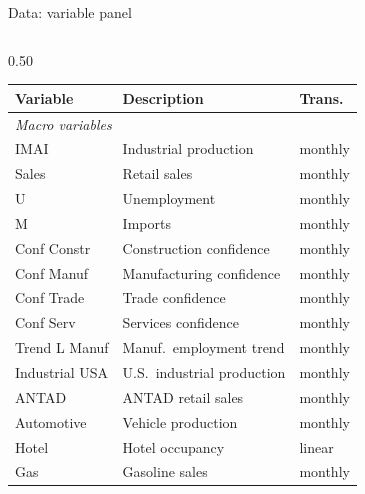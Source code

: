 \documentclass[handout,aspectratio=169,11pt,xcolor={dvipsnames},hyperref={pdftex,pdfpagemode=UseNone,hidelinks,pdfdisplaydoctitle=true},usepdftitle=false]{beamer}
\begin{document}
\begin{frame}{Data: variable panel}
\vspace{-1mm}
\begin{columns}[T]

\begin{column}{0.50\textwidth}
\tiny
\begin{tabular}{p{1.5cm}p{2.6cm}l}
\hline
\textbf{Variable} & \textbf{Description} & \textbf{Trans.} \\
\hline
\multicolumn{3}{l}{\textit{Macro variables}} \\
\hline
IMAI             & Industrial production          & monthly \\
Sales            & Retail sales                   & monthly \\
U                & Unemployment                   & monthly \\
M                & Imports                        & monthly \\
Conf Constr      & Construction confidence        & monthly \\
Conf Manuf       & Manufacturing confidence       & monthly \\
Conf Trade 		& Trade confidence  & monthly \\
Conf Serv        & Services confidence            & monthly \\
Trend L Manuf    & Manuf.\ employment trend       & monthly \\
Industrial USA   & U.S.\ industrial production    & monthly \\
ANTAD            & ANTAD retail sales             & monthly \\
Automotive       & Vehicle production             & monthly \\
Hotel            & Hotel occupancy                & linear  \\
Gas              & Gasoline sales                 & monthly \\
\hline
\end{tabular}
\end{column}


\end{columns}
\end{frame}
\end{document}

